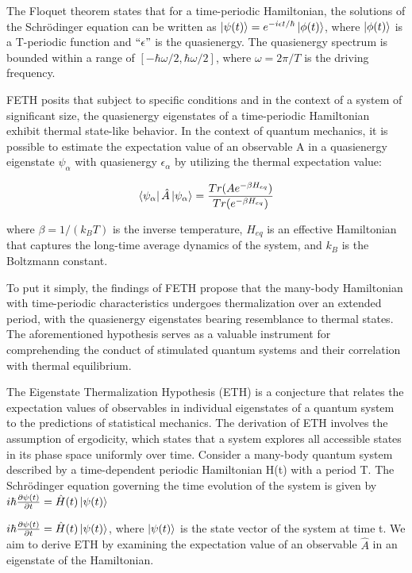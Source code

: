 \documentclass[%
reprint,
superscriptaddress,
amsmath,amssymb,
aps,
prb,
]{revtex4-2}
\begin{document}
The Floquet theorem states that for a time-periodic Hamiltonian, the solutions of the Schrödinger equation can be written as $\ket{\psi(t)} = e^{-i\epsilon t/\hbar} \ket{\phi(t)}$, where $\ket{\phi(t)}$ is a T-periodic function and $``\epsilon"$ is the quasienergy. The quasienergy spectrum is bounded within a range of $[-\hbar\omega/2, \hbar\omega/2]$, where $\omega = 2\pi/T$ is the driving frequency.

FETH posits that subject to specific conditions and in the context of a system of significant size, the quasienergy eigenstates of a time-periodic Hamiltonian exhibit thermal state-like behavior. In the context of quantum mechanics, it is possible to estimate the expectation value of an observable A in a quasienergy eigenstate $\psi_\alpha$ with quasienergy $\epsilon_\alpha$ by utilizing the thermal expectation value:

\begin{equation}
\bra{\psi_\alpha}\hat{A}\ket{\psi_\alpha} = \frac{Tr (Ae^{-\beta H_{eq}})}{Tr(e^{-\beta H_{eq}})}
\end{equation}
 
where $\beta = 1/(k_B T)$ is the inverse temperature, $H_{eq}$ is an effective Hamiltonian that captures the long-time average dynamics of the system, and $k_B$ is the Boltzmann constant.

To put it simply, the findings of FETH propose that the many-body Hamiltonian with time-periodic characteristics undergoes thermalization over an extended period, with the quasienergy eigenstates bearing resemblance to thermal states. The aforementioned hypothesis serves as a valuable instrument for comprehending the conduct of stimulated quantum systems and their correlation with thermal equilibrium.


The Eigenstate Thermalization Hypothesis (ETH) is a conjecture that relates the expectation values of observables in individual eigenstates of a quantum system to the predictions of statistical mechanics. The derivation of ETH involves the assumption of ergodicity, which states that a system explores all accessible states in its phase space uniformly over time.
Consider a many-body quantum system described by a time-dependent periodic Hamiltonian H(t) with a period T. The Schrödinger equation governing the time evolution of the system is given by $i\hbar \pdv{\psi(t)}{t} = \hat{H}(t) \ket{\psi(t)}$

$i\hbar \pdv{\psi(t)}{t} = \hat{H}(t) \ket{\psi(t)}$, where $\ket{\psi(t)}$ is the state vector of the system at time t. We aim to derive ETH by examining the expectation value of an observable $\hat{A}$ in an eigenstate of the Hamiltonian.
\end{document}
